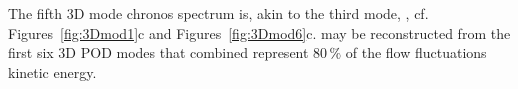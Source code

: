 {{{The fifth 3D mode chronos  spectrum is, akin to the third mode, , cf. Figures~\ref{fig:3Dmod1}c and Figures~\ref{fig:3Dmod6}c.  may be reconstructed from the first six 3D POD modes that combined represent {$80\,\%$} of the flow fluctuations kinetic energy.



}}}
